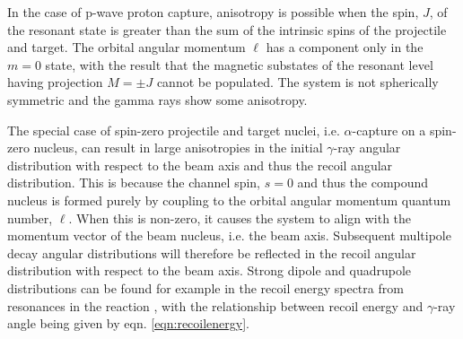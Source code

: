 In the case of p-wave proton capture, anisotropy is possible when the spin, $J$, of the resonant state is greater than the sum of the intrinsic spins of the projectile and target. The orbital angular momentum $\ell$ has a component only in the $m=0$ state, with the result that the magnetic substates of the resonant level having projection $M=\pm J$ cannot be populated. The system is not spherically symmetric and the gamma rays show some anisotropy.

The special case of spin-zero projectile and target nuclei, i.e. $\alpha$-capture on a spin-zero nucleus, can result in large anisotropies in the initial $\gamma$-ray angular distribution with respect to the beam axis and thus the recoil angular distribution. This is because the channel spin, $s=0$ and thus the compound nucleus is formed purely by coupling to the orbital angular momentum quantum number, $\ell$. When this is non-zero, it causes the system to align with the momentum vector of the beam nucleus, i.e. the beam axis. Subsequent multipole decay angular distributions will therefore be reflected in the recoil angular distribution with respect to the beam axis. Strong dipole and quadrupole distributions can be found for example in the recoil energy spectra from resonances in the \reac{\alpha}{\gamma} reaction \cite{mat06}, with the relationship between recoil energy and $\gamma$-ray angle being given by eqn. \ref{eqn:recoilenergy}. 


